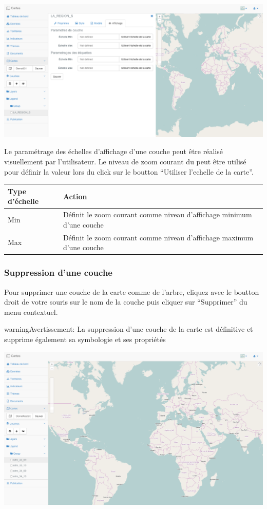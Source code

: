 \documentclass[letterpaper,10pt,french]{sphinxmanual}
\begin{document}
\includegraphics[width=1.000\linewidth]{layer-display-def.png}

Le paramétrage des échelles d'affichage d'une couche peut être réalisé
visuellement par l'utilisateur. Le niveau de zoom courant du
 peut être utilisé pour définir la valeur
lors du click sur le boutton ``Utiliser l'echelle de la carte''.

\begin{tabulary}{\linewidth}{|L|L|}
\hline

\textbf{Type d'échelle}
 & 
\textbf{Action}
\\
\hline
Min
 & 
Définit le zoom courant comme niveau d'affichage minimum d'une couche
\\
\hline
Max
 & 
Définit le zoom courant comme niveau d'affichage maximum d'une couche
\\
\hline\end{tabulary}



\subsubsection{Suppression d'une couche}
\label{maps/layerstree:suppression-d-une-couche}
Pour supprimer une couche de la carte comme de l'arbre, cliquez avec
le boutton droit de votre souris sur le nom de la couche puis cliquer
sur ``Supprimer'' du menu contextuel.

\begin{notice}{warning}{Avertissement:}
La suppression d'une couche de la carte est définitive et supprime également sa symbologie et ses propriétés
\end{notice}

\includegraphics{maps-module-preview.png}
\end{document}
